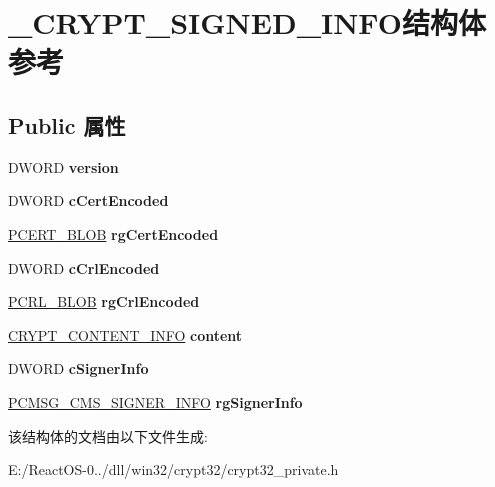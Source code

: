 \hypertarget{struct___c_r_y_p_t___s_i_g_n_e_d___i_n_f_o}{}\section{\+\_\+\+C\+R\+Y\+P\+T\+\_\+\+S\+I\+G\+N\+E\+D\+\_\+\+I\+N\+F\+O结构体 参考}
\label{struct___c_r_y_p_t___s_i_g_n_e_d___i_n_f_o}
\subsection*{Public 属性}
\begin{DoxyCompactItemize}
\item 
\mbox{\label{struct___c_r_y_p_t___s_i_g_n_e_d___i_n_f_o_a9b763893a4b99a9a85b9db863476e48b}} 
D\+W\+O\+RD {\bfseries version}
\item 
\mbox{\label{struct___c_r_y_p_t___s_i_g_n_e_d___i_n_f_o_add9f7bc86c1c2a2002bbb5f494b16697}} 
D\+W\+O\+RD {\bfseries c\+Cert\+Encoded}
\item 
\mbox{\label{struct___c_r_y_p_t___s_i_g_n_e_d___i_n_f_o_a2e3eb0f0a0c58b643e3d200ca83bbb3c}} 
\hyperlink{struct___c_r_y_p_t_o_a_p_i___b_l_o_b}{P\+C\+E\+R\+T\+\_\+\+B\+L\+OB} {\bfseries rg\+Cert\+Encoded}
\item 
\mbox{\label{struct___c_r_y_p_t___s_i_g_n_e_d___i_n_f_o_ae7cdfc9a079e490d1194095f7b200208}} 
D\+W\+O\+RD {\bfseries c\+Crl\+Encoded}
\item 
\mbox{\label{struct___c_r_y_p_t___s_i_g_n_e_d___i_n_f_o_ac247ad0b9061abb4222aa1f6a547c2a1}} 
\hyperlink{struct___c_r_y_p_t_o_a_p_i___b_l_o_b}{P\+C\+R\+L\+\_\+\+B\+L\+OB} {\bfseries rg\+Crl\+Encoded}
\item 
\mbox{\label{struct___c_r_y_p_t___s_i_g_n_e_d___i_n_f_o_a535a12f987e54b9a7771923d2cd99615}} 
\hyperlink{struct___c_r_y_p_t___c_o_n_t_e_n_t___i_n_f_o}{C\+R\+Y\+P\+T\+\_\+\+C\+O\+N\+T\+E\+N\+T\+\_\+\+I\+N\+FO} {\bfseries content}
\item 
\mbox{\label{struct___c_r_y_p_t___s_i_g_n_e_d___i_n_f_o_a3e5381fe6baf3a27a9e0be22e7be1561}} 
D\+W\+O\+RD {\bfseries c\+Signer\+Info}
\item 
\mbox{\label{struct___c_r_y_p_t___s_i_g_n_e_d___i_n_f_o_acbc7e7a7263215b9c5072fc90d0bbcef}} 
\hyperlink{struct___c_m_s_g___c_m_s___s_i_g_n_e_r___i_n_f_o}{P\+C\+M\+S\+G\+\_\+\+C\+M\+S\+\_\+\+S\+I\+G\+N\+E\+R\+\_\+\+I\+N\+FO} {\bfseries rg\+Signer\+Info}
\end{DoxyCompactItemize}


该结构体的文档由以下文件生成\+:\begin{DoxyCompactItemize}
\item 
E\+:/\+React\+O\+S-\/0../dll/win32/crypt32/crypt32\+\_\+private.\+h\end{DoxyCompactItemize}
